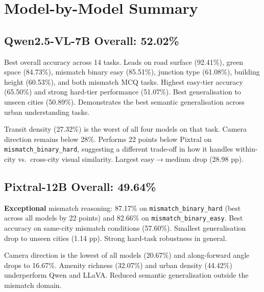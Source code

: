\documentclass[11pt,a4paper]{article}
\begin{document}
\section{Model-by-Model Summary}

\subsection{Qwen2.5-VL-7B \hfill{\normalfont\small Overall: 52.02\%}}

\begin{infobox}[Strengths]
Best overall accuracy across 14 tasks. Leads on road surface (92.41\%),
green space (84.73\%), mismatch binary easy (85.51\%), junction type (61.08\%),
building height (60.53\%), and both mismatch MCQ tasks. Highest easy-tier
accuracy (65.50\%) and strong hard-tier performance (51.07\%). Best
generalisation to unseen cities (50.89\%). Demonstrates the best semantic
generalisation across urban understanding tasks.
\end{infobox}

\begin{warnbox}[Weaknesses]
Transit density (27.32\%) is the worst of all four models on that task.
Camera direction remains below 28\%. Performs 22 points below Pixtral on
\texttt{mismatch\_binary\_hard}, suggesting a different trade-off in how it
handles within-city vs.\ cross-city visual similarity. Largest easy$\to$medium
drop (28.98 pp).
\end{warnbox}

\subsection{Pixtral-12B \hfill{\normalfont\small Overall: 49.64\%}}

\begin{infobox}[Strengths]
\textbf{Exceptional} mismatch reasoning: 87.17\% on
\texttt{mismatch\_binary\_hard} (best across all models by 22 points) and
82.66\% on \texttt{mismatch\_binary\_easy}. Best accuracy on same-city
mismatch conditions (57.60\%). Smallest generalisation drop to unseen cities
(1.14 pp). Strong hard-task robustness in general.
\end{infobox}

\begin{warnbox}[Weaknesses]
Camera direction is the lowest of all models (20.67\%) and
along-forward angle drops to 16.67\%. Amenity richness (32.07\%) and
urban density (44.42\%) underperform Qwen and LLaVA. Reduced semantic
generalisation outside the mismatch domain.
\end{warnbox}
\end{document}
